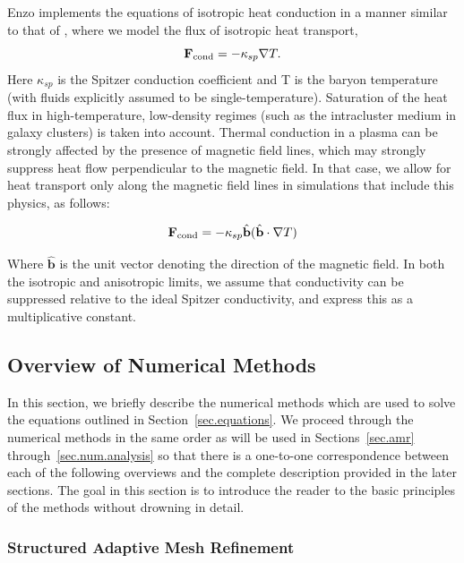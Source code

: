 Enzo implements the equations of isotropic heat conduction in a manner
similar to that of \citet{2007ApJ...664..135P}, where we model the
flux of isotropic heat transport,
%
\begin{equation}
\fcond = -\kappa_{sp} \nabla T.
\end{equation}
%
Here $\kappa_{sp}$ is the Spitzer conduction coefficient
\citep{1962pfig.book.....S} and T is the baryon temperature (with
fluids explicitly assumed to be single-temperature).  Saturation of
the heat flux in high-temperature, low-density regimes (such as the
intracluster medium in galaxy clusters) is taken into account.
Thermal conduction in a plasma can be strongly affected by the
presence of magnetic field lines, which may strongly suppress heat
flow perpendicular to the magnetic field.  In that case, we allow for
heat transport only along the magnetic field lines in simulations that
include this physics, as follows:

\begin{equation}
\fcond= -\kappa_{sp} \hat{\textbf{b}} (\hat{\textbf{b}} \cdot \nabla T)
\end{equation}

Where $\hat{\textbf{b}}$ is the unit vector denoting the direction of
the magnetic field.  In both the isotropic and anisotropic limits, we
assume that conductivity can be suppressed relative to the ideal
Spitzer conductivity, and express this as a multiplicative constant.


\subsection{Overview of Numerical Methods}
\label{sec.method_overview}

In this section, we briefly describe the numerical methods which are
used to solve the equations outlined in Section~\ref{sec.equations}.
We proceed through the numerical methods in the same order as will be
used in Sections~\ref{sec.amr} through~\ref{sec.num.analysis} so that
there is a one-to-one correspondence between each of the following
overviews and the complete description provided in the later sections.
The goal in this section is to introduce the reader to the basic
principles of the methods without drowning in detail.

\subsubsection{Structured Adaptive Mesh Refinement}

